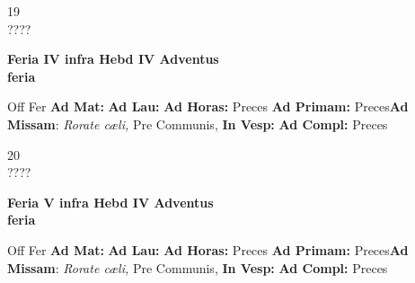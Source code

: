 \documentclass[10pt, openany]{book}
\begin{document}
    \begin{center}
        \begin{minipage}{3.5in}
            \vspace{2em}
            \begin{minipage}{0.5in}
                {\Huge 19} \\
                {\normalsize ????}
            \end{minipage}
            \begin{minipage}{3.0in}
                \textbf{ \large Feria IV infra Hebd IV Adventus \\
                \textnormal{\normalsize feria}}

            \end{minipage}
            \begin{justify}Off Fer
                \textbf{Ad Mat: }
                \textbf{Ad Lau: }
                \textbf{Ad Horas: }Preces
                \textbf{Ad Primam: }Preces\textbf{Ad Missam}: \textit{Rorate cæli,} Pre Communis, 
                \textbf{In Vesp: }
                \textbf{Ad Compl: }Preces
            \end{justify}
        \end{minipage}
    \end{center}

    \begin{center}
        \begin{minipage}{3.5in}
            \vspace{2em}
            \begin{minipage}{0.5in}
                {\Huge 20} \\
                {\normalsize ????}
            \end{minipage}
            \begin{minipage}{3.0in}
                \textbf{ \large Feria V infra Hebd IV Adventus \\
                \textnormal{\normalsize feria}}

            \end{minipage}
            \begin{justify}Off Fer
                \textbf{Ad Mat: }
                \textbf{Ad Lau: }
                \textbf{Ad Horas: }Preces
                \textbf{Ad Primam: }Preces\textbf{Ad Missam}: \textit{Rorate cæli,} Pre Communis, 
                \textbf{In Vesp: }
                \textbf{Ad Compl: }Preces
            \end{justify}
        \end{minipage}
    \end{center}
\end{document}

